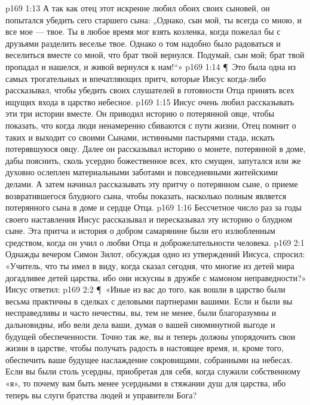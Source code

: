 \vs p169 1:13 А так как отец этот искренне любил обоих своих сыновей, он попытался убедить сего старшего сына: „Однако, сын мой, ты всегда со мною, и все мое --- твое. Ты в любое время мог взять козленка, когда пожелал бы с друзьями разделить веселье твое. Однако о том надобно было радоваться и веселиться вместе со мной, что брат твой вернулся. Подумай, сын мой; брат твой пропадал и нашелся, и живой вернулся к нам!“»
\vs p169 1:14 \P\ Это была одна из самых трогательных и впечатляющих притч, которые Иисус когда\hyp{}либо рассказывал, чтобы убедить своих слушателей в готовности Отца принять всех ищущих входа в царство небесное.
\vs p169 1:15 Иисус очень любил рассказывать эти три истории вместе. Он приводил историю о потерянной овце, чтобы показать, что когда люди ненамеренно сбиваются с пути жизни, Отец помнит о таких  и выходит со своими Сынами, истинными пастырями стада, искать потерявшуюся овцу. Далее он рассказывал историю о монете, потерянной в доме, дабы пояснить, сколь усердно божественное  всех, кто смущен, запутался или же духовно ослеплен материальными заботами и повседневными житейскими делами. А затем начинал рассказывать эту притчу о потерянном сыне, о приеме возвратившегося блудного сына, чтобы показать, насколько полным является  потерянного сына в доме и сердце Отца.
\vs p169 1:16 Бессчетное число раз за годы своего наставления Иисус рассказывал и пересказывал эту историю о блудном сыне. Эта притча и история о добром самарянине были его излюбленным средством, когда он учил о любви Отца и доброжелательности человека.
\vs p169 2:1 Однажды вечером Симон Зилот, обсуждая одно из утверждений Иисуса, спросил: «Учитель, что ты имел в виду, когда сказал сегодня, что многие из детей мира догадливее детей царства, ибо они искусны в дружбе с мамоном неправедности?» Иисус ответил:
\vs p169 2:2 \P\ «Иные из вас до того, как вошли в царство были весьма практичны в сделках с деловыми партнерами вашими. Если и были вы несправедливы и часто нечестны, вы, тем не менее, были благоразумны и дальновидны, ибо вели дела ваши, думая о вашей сиюминутной выгоде и будущей обеспеченности. Точно так же, вы и теперь должны упорядочить свои жизни в царстве, чтобы получать радость в настоящее время, и, кроме того, обеспечить ваше будущее наслаждение сокровищами, собранными на небесах. Если вы были столь усердны, приобретая для себя, когда служили собственному «я», то почему вам быть менее усердными в стяжании душ для царства, ибо теперь вы слуги братства людей и управители Бога?
